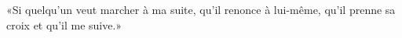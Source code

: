 \encetemps \jesusdisciples
	«Si quelqu’un veut marcher à ma suite,
	qu’il renonce à lui-même, qu’il prenne sa croix et qu’il me suive.»
